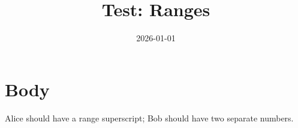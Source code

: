 \documentclass{article}
\title{Test: Ranges}
\date{2026-01-01}
\begin{document}
\maketitle
\section{Body}
Alice should have a range superscript; Bob should have two separate numbers.
\end{document}
